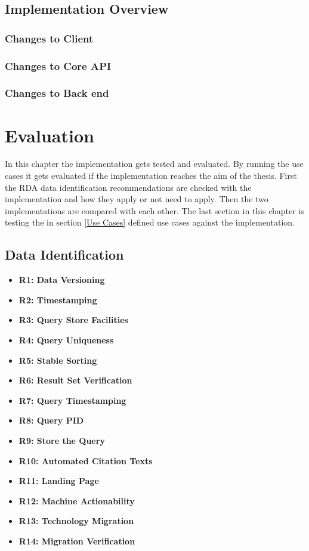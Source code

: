 \documentclass[draft,final]{vutinfth} %
\begin{document}

\section{Implementation Overview}\label{Implementation Overview}

\subsection{Changes to Client}
\subsection{Changes to Core API}
\subsection{Changes to Back end}

\chapter{Evaluation}\label{Evaluation}
In this chapter the implementation gets tested and evaluated. By running the use cases it gets evaluated if the implementation reaches the aim of the thesis. First the RDA data identification recommendations are checked with the implementation and how they apply or not need to apply. Then the two implementations are compared with each other. The last section in this chapter is testing the in section \ref{Use Cases} defined use cases against the implementation. 

\section{Data Identification}\label{Evaluation:Data Identification}
\begin{itemize}
	\item \textbf{R1: Data Versioning}
	\item \textbf{R2: Timestamping}
	\item \textbf{R3: Query Store Facilities}
	\item \textbf{R4: Query Uniqueness}
	\item \textbf{R5: Stable Sorting}
	\item \textbf{R6: Result Set Verification}
	\item \textbf{R7: Query Timestamping}
	\item \textbf{R8: Query PID}
	\item \textbf{R9: Store the Query}
	\item \textbf{R10: Automated Citation Texts}
	\item \textbf{R11: Landing Page}
	\item \textbf{R12: Machine Actionability}
	\item \textbf{R13: Technology Migration}
	\item \textbf{R14: Migration Verification}
\end{itemize}
\end{document}
